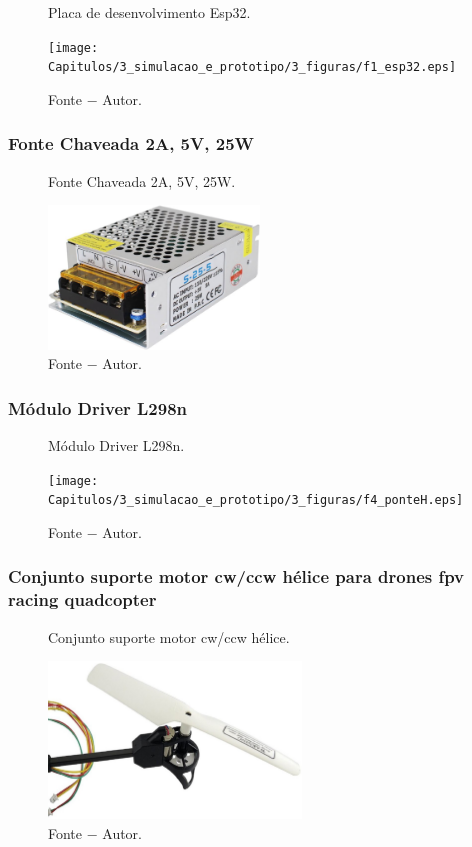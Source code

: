 \begin{figure}[!h]
	\centering
	\caption{Placa de desenvolvimento Esp32.}
	\texttt{[image: Capitulos/3\_simulacao\_e\_prototipo/3\_figuras/f1\_esp32.eps]}
	\caption*{Fonte $-$ Autor.}
	\label{fig3:image_05}
\end{figure}


\subsubsection{Fonte Chaveada 2A, 5V, 25W}

\begin{figure}[!h]
	\centering
	\caption{Fonte Chaveada 2A, 5V, 25W.}
	\includegraphics[width=0.5\textwidth]{Capitulos/3_simulacao_e_prototipo/3_figuras/f1_fonte.eps}
	\caption*{Fonte $-$ Autor.}
	\label{fig3:image_06}
\end{figure}

\subsubsection{Módulo Driver L298n}

\begin{figure}[!h]
	\centering
	\caption{Módulo Driver L298n.}
	\texttt{[image: Capitulos/3\_simulacao\_e\_prototipo/3\_figuras/f4\_ponteH.eps]}
	\caption*{Fonte $-$ Autor.}
	\label{fig3:image_07}
\end{figure}


\subsubsection{Conjunto suporte motor cw/ccw hélice para drones fpv racing quadcopter}

\begin{figure}[!h]
	\centering
	\caption{Conjunto suporte motor cw/ccw hélice.}
	\includegraphics[width=0.6\textwidth]{Capitulos/3_simulacao_e_prototipo/3_figuras/f1_braco_aerop.eps}
	\caption*{Fonte $-$ Autor.}
	\label{fig3:image_08}
\end{figure}

